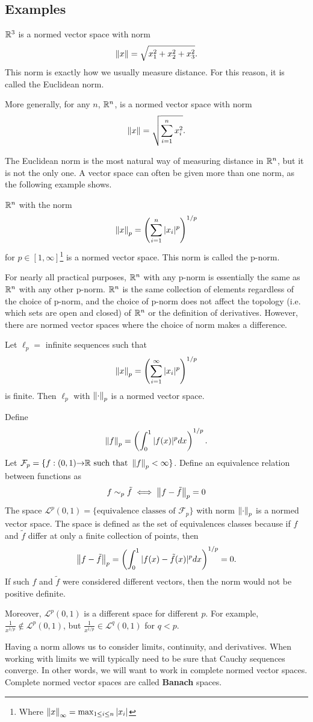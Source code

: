 \subsection{Examples}
\begin{example}
  $\mathbb{R}^3$ is a normed vector space with norm
  \[ \left\Vert {x} \right\Vert = \sqrt{x_1^2 + x_2^2 + x_3^2}. \] 
  This norm is exactly
  how we usually measure distance. For this reason, it is called the
  Euclidean norm.

  More generally, for any $n$, $\mathbb{R}^n$, is a normed vector space with
  norm 
  \[ \left\Vert {x} \right\Vert = \sqrt{\sum_{i=1}^n x_i^2 }. \]
\end{example}
The Euclidean norm is the most natural way of measuring distance in
$\mathbb{R}^n$, but it is not the only one.  A vector space can often be given
more than one norm, as the following example shows.
\begin{example}
  $\mathbb{R}^n$ with the norm 
  \[ \left\Vert {x} \right\Vert_p = \left( \sum_{i=1}^n |x_i|^p \right)^{1/p} \]
  for $p \in [1,\infty]$\footnote{Where $\left\Vert {x} \right\Vert_\infty = \max_{1\leq
      i \leq n} |x_i| $} is a normed vector space. This norm is called
  the p-norm. 
\end{example}
For nearly all practical purposes, $\mathbb{R}^n$ with any p-norm is
essentially the same as $\mathbb{R}^n$ with any other p-norm. $\mathbb{R}^n$ is the
same collection of elements regardless of the choice of p-norm, and
the choice of p-norm does not affect the topology (i.e. which sets are
open and closed) of $\mathbb{R}^n$ or the definition of derivatives. However,
there are normed vector spaces where the choice of norm makes a
difference.
\begin{example}
  Let $\ell_p =$ infinite sequences such that 
  \[ \left\Vert {x} \right\Vert_p = \left( \sum_{i=1}^\infty |x_i|^p \right)^{1/p} \]
  is finite. Then $\ell_p$ with $\left\Vert {\cdot} \right\Vert_p$ is a normed vector
  space. 
\end{example}
\begin{example}
  Define 
  \[ \left\Vert {f} \right\Vert_p = \left(\int_0^1 |f(x)|^p dx\right)^{1/p}. \]
  Let $\mathcal{F}_p = \{f: (0,1) {\rightarrow} \mathbb{R} \text{ such that }
  \left\Vert {f} \right\Vert_p<\infty\}$. 
  Define an equivalence relation between functions as
  \[ f \sim_p \tilde{f} \iff \left\Vert {f - \tilde{f}} \right\Vert_p = 0 \]
  The space  $\mathcal{L}^p(0,1) = \{\text{equivalence classes of
  }\mathcal{F}_p\}$ with norm $\left\Vert {\cdot} \right\Vert_p$ is a
  normed vector space. The space is defined as the set of equivalences
  classes because if $f$ and $\tilde{f}$ differ at only a finite
  collection of points, then
  \[ \left\Vert {f-\tilde{f}} \right\Vert_p = \left(\int_0^1 |f(x) - \tilde{f}(x) |^p dx\right)^{1/p} =
  0. \]
  If such $f$ and $\tilde{f}$ were considered different vectors, then
  the norm would not be positive definite. 
  
  Moreover, $\mathcal{L}^p(0,1)$ is a different
  space for different $p$. For example, $\frac{1}{x^{1/p}} \not\in
  \mathcal{L}^p(0,1)$, but $\frac{1}{x^{1/p}} \in \mathcal{L}^q(0,1)$
  for $q < p$. 
\end{example}
Having a norm allows us to consider limits, continuity, and
derivatives. When working with limits we will typically need to be
sure that Cauchy sequences converge. In other words, we will want to
work in complete normed vector spaces. Complete normed vector spaces
are called \textbf{Banach} spaces. 

